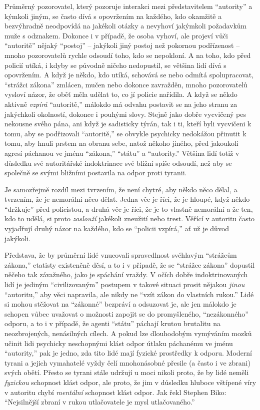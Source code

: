 \documentclass{book}
\begin{document}
Průměrný pozorovatel, který pozoruje interakci mezi představitelem \enquote{autority} a kýmkoli jiným, se často dívá s opovržením na každého, kdo okamžitě a bezvýhradně neodpovídá na jakékoli otázky a nevyhoví jakýmkoli požadavkům muže s odznakem. Dokonce i v případě, že osoba vyhoví, ale projeví vůči \enquote{autoritě} nějaký \enquote{postoj} -- jakýkoli jiný postoj než pokornou podřízenost -- mnoho pozorovatelů rychle odsoudí toho, kdo se nepokloní. A na toho, kdo před policií utíká, i kdyby se původně ničeho nedopustil, se většina lidí dívá s opovržením. A když je někdo, kdo utíká, schovává se nebo odmítá spolupracovat, \enquote{strážci zákona} zmlácen, mučen nebo dokonce zavražděn, mnoho pozorovatelů vysloví názor, že oběť měla udělat to, co jí policie nařídila. A když se někdo aktivně \emph{vzpírá} \enquote{autoritě,} málokdo má odvahu postavit se na jeho stranu za jakýchkoli okolností, dokonce i pouhými slovy. Stejně jako dobře vycvičený pes nekousne svého pána, ani když je sadisticky týrán, tak i ti, kteří byli vycvičeni k tomu, aby se podřizovali \enquote{autoritě,} se obvykle psychicky nedokážou přinutit k tomu, aby hnuli prstem na obranu sebe, natož někoho jiného, před jakoukoli agresí páchanou ve jménu \enquote{zákona,} \enquote{státu} a \enquote{autority.} Většina lidí totiž v důsledku své autoritářské indoktrinace své bližní spíše odsoudí, než aby se společně se svými bližními postavila na odpor proti tyranii.

Je samozřejmě rozdíl mezi tvrzením, že není chytré, aby někdo něco dělal, a tvrzením, že je nemorální něco dělat. Jedna věc je říci, že je hloupé, když někdo \enquote{držkuje} před policistou, a druhá věc je říci, že je to vlastně nemorální a že ten, kdo to udělá, si proto \emph{zaslouží} jakékoli zneužití nebo trest. Věřící v autoritu často vyjadřují druhý názor na každého, kdo se \enquote{policii vzpírá,} ať už je důvod jakýkoli.

Představa, že by průměrní lidé vnucovali spravedlnost svéhlavým \enquote{strážcům zákona,} etatisty existenčně děsí, a to i v případě, že se \enquote{strážce zákona} dopustil něčeho tak závažného, jako je spáchání vraždy. V očích dobře indoktrinovaných lidí je jediným \enquote{civilizovaným} postupem v takové situaci prosit nějakou \emph{jinou} \enquote{autoritu,} aby věci napravila, ale nikdy ne \enquote{vzít zákon do vlastních rukou.} Lidé si mohou stěžovat na \enquote{zákonné} bezpráví a odsuzovat je, ale jen málokdo je schopen vůbec uvažovat o možnosti zapojit se do promyšleného, \enquote{nezákonného} odporu, a to i v případě, že agenti \enquote{státu} páchají krutou brutalitu na neozbrojených, nenásilných cílech. A pokud lze dlouhodobým vymýváním mozků učinit lidi psychicky neschopnými klást odpor útlaku páchanému ve jménu \enquote{autority,} pak je jedno, zda tito lidé mají fyzické prostředky k odporu. Moderní tyrani a jejich vymahatelé vyždy čelí mnohonásobné přesile (a často i ve zbrani) svých obětí. Přesto se tyrani stále udržují u moci nikoli proto, že by lidé neměli \emph{fyzickou} schopnost klást odpor, ale proto, že jim v důsledku hluboce vštípené víry v autoritu chybí \emph{mentální} schopnost klást odpor. Jak řekl Stephen Biko: \enquote{Nejsilnější zbraní v rukou utlačovatele je mysl utlačovaného.}
\end{document}
